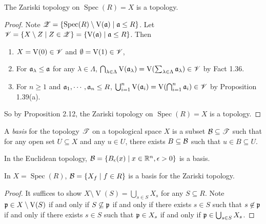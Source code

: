 \begin{theorem}
    The Zariski topology on $\operatorname{Spec}(R) = X$ is a topology.
\end{theorem}

\begin{proof}
    Note $\mathscr{Z} = \{\operatorname{Spec}(R) \setminus \operatorname{V}(\mathfrak{a}) \mid \mathfrak{a} \leq R\}$. Let $\mathscr{V} = \{X \setminus Z \mid Z \in \mathscr{Z}\} = \{\operatorname{V}(\mathfrak{a}) \mid \mathfrak{a} \leq R\}$. Then
    \begin{enumerate}
        \item $X = \operatorname{V}(0) \in \mathscr{V}$ and $\emptyset = \operatorname{V}(1) \in \mathscr{V}$,
        \item For $\mathfrak{a}_\lambda \leq \mathfrak{a}$ for any $\lambda \in \Lambda$, $\bigcap_{\lambda \in \Lambda} \operatorname{V}(\mathfrak{a}_\lambda) = \operatorname{V}(\sum_{\lambda \in \Lambda} \mathfrak{a}_\lambda) \in \mathscr{V}$ by Fact 1.36.
        \item For $n \geq 1$ and $\mathfrak{a}_1,\cdots,\mathfrak{a}_n \leq R$, $\bigcup_{i=1}^n \operatorname{V}(\mathfrak{a}_i) = \operatorname{V}(\bigcap_{i=1}^n \mathfrak{a}_i) \in \mathscr{V}$ by Proposition 1.39(a). \qedhere
    \end{enumerate}
    So by Proposition 2.12, the Zariski topology on $\operatorname{Spec}(R) = X$ is a topology.
\end{proof}

\begin{definition}
    A \emph{basis} for the topology $\mathscr{T}$ on a topological space $X$ is a subset $\mathcal{B} \subseteq \mathscr{T}$ such that for any open set $U \subseteq X$ and any $u \in U$, there exists $B \subseteq \mathcal{B}$ such that $u \in B \subseteq U$.
\end{definition}

\begin{example}
    In the Euclidean topology, $\mathcal{B} = \{B_\epsilon(x) \mid x \in \mathbb{R}^n, \epsilon > 0\}$ is a basis.
\end{example}

\begin{theorem}
    In $X = \operatorname{Spec}(R)$, $\mathcal{B} = \{X_f \mid f \in R\}$ is a basis for the Zariski topology.
\end{theorem}

\begin{proof}
    It suffices to show $X \setminus \operatorname{V}(S) = \bigcup_{s \in S}X_s$ for any $S \subseteq R$. Note $\mathfrak{p} \in X \setminus \operatorname{V}(S)$ if and only if $S \not \subseteq \mathfrak{p}$ if and only if there exists $s \in S$ such that $s \not \in \mathfrak{p}$ if and only if there exists $s \in S$ such that $\mathfrak{p} \in X_s$ if and only if $\mathfrak{p} \in \bigcup_{s \in S}X_s$.
\end{proof}

